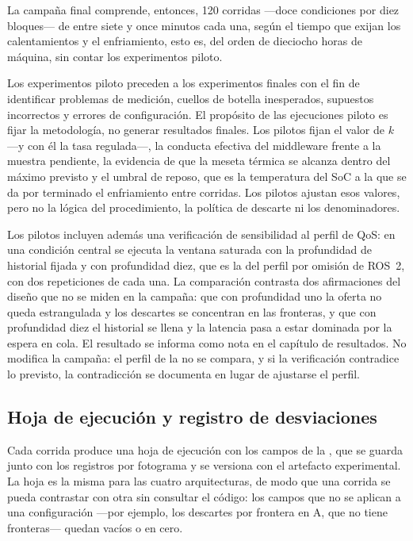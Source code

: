 La campaña final comprende, entonces, 120 corridas ---doce condiciones por
diez bloques--- de entre siete y once minutos cada una, según el tiempo que
exijan los calentamientos y el enfriamiento, esto es, del orden de dieciocho
horas de máquina, sin contar los experimentos piloto.

Los experimentos piloto preceden a los experimentos finales con el fin de
identificar problemas de medición, cuellos de botella inesperados,
supuestos incorrectos y errores de configuración. El propósito de las
ejecuciones piloto es fijar la metodología, no generar resultados finales.
Los pilotos fijan el valor de $k$ ---y con él la tasa regulada---, la
conducta efectiva del middleware frente a la muestra pendiente, la
evidencia de que la meseta térmica se alcanza dentro del máximo previsto y
el umbral de reposo, que es la temperatura del SoC a la que se da por
terminado el enfriamiento entre corridas. Los pilotos ajustan esos valores,
pero no la lógica del procedimiento, la política de descarte ni los
denominadores.

Los pilotos incluyen además una verificación de sensibilidad al perfil de
QoS: en una condición central se ejecuta la ventana saturada con la
profundidad de historial fijada y con profundidad diez, que es la del perfil
por omisión de ROS~2, con dos repeticiones de cada una. La comparación
contrasta dos afirmaciones del diseño que no se miden en la campaña: que con
profundidad uno la oferta no queda estrangulada y los descartes se
concentran en las fronteras, y que con profundidad diez el historial se llena
y la latencia pasa a estar dominada por la espera en cola. El resultado se
informa como nota en el capítulo de resultados. No modifica la campaña: el
perfil de la  no se compara, y si la verificación contradice lo
previsto, la contradicción se documenta en lugar de ajustarse el perfil.

\subsection{Hoja de ejecución y registro de desviaciones}
\label{sec:run-sheet}

Cada corrida produce una hoja de ejecución con los campos de la
, que se guarda junto con los registros por fotograma
y se versiona con el artefacto experimental. La hoja es la misma para las
cuatro arquitecturas, de modo que una corrida se pueda contrastar con otra
sin consultar el código: los campos que no se aplican a una configuración
---por ejemplo, los descartes por frontera en A, que no tiene fronteras---
quedan vacíos o en cero.

